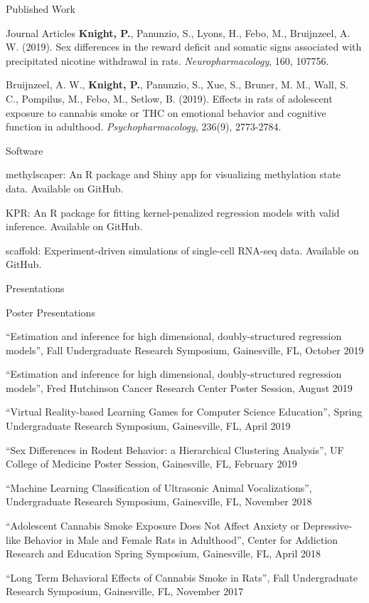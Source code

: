 \documentclass{resume}
\begin{document}
\begin{rSection}{Published Work}
\begin{rSubsection}{Journal Articles}{}{}{}
      \textbf{Knight, P.}, Panunzio, S., Lyons, H., Febo, M., Bruijnzeel, A. W. (2019). Sex differences in
      the reward deficit and somatic signs associated with
      precipitated nicotine withdrawal in rats. \textit{Neuropharmacology},
      160, 107756.
    \item Bruijnzeel, A. W., \textbf{Knight, P.}, Panunzio, S., Xue, S.,
      Bruner, M. M., Wall, S. C., Pompilus, M., Febo, M., Setlow, B. (2019). Effects in
      rats of adolescent exposure to cannabis smoke or THC on
      emotional behavior and cognitive function in
      adulthood. \textit{Psychopharmacology}, 236(9), 2773-2784.
    \end{rSubsection}
    \begin{rSubsection}{Software}{}{}{}
	\item methylscaper: An R package and Shiny app for visualizing methylation state data.     Available on GitHub.
	\item KPR: An R package for fitting kernel-penalized regression models with valid inference. Available on GitHub.
	\item scaffold: Experiment-driven simulations of single-cell RNA-seq data. Available on GitHub.
    \end{rSubsection}
    \end{rSection}

\begin{rSection}{Presentations}
  \begin{rSubsection}{Poster Presentations}{}{}{} %
    \item ``Estimation and inference for high dimensional,
      doubly-structured regression models'', Fall Undergraduate
      Research Symposium, Gainesville, FL, October 2019
    \item  ``Estimation and inference for high dimensional,
      doubly-structured regression models'', Fred Hutchinson Cancer Research Center Poster Session, August 2019
      \item ``Virtual Reality-based Learning Games for Computer Science Education'', Spring Undergraduate Research Symposium, Gainesville, FL, April 2019 
      \item ``Sex Differences in Rodent Behavior: a Hierarchical Clustering Analysis'', UF College of Medicine Poster Session, Gainesville, FL, February 2019
      \item ``Machine Learning Classification of Ultrasonic Animal Vocalizations'', Undergraduate Research Symposium, Gainesville, FL, November 2018
      \item ``Adolescent Cannabis Smoke Exposure Does Not Affect
        Anxiety or Depressive-like Behavior in Male and Female Rats in
        Adulthood'', Center for Addiction Research and Education Spring Symposium, Gainesville, FL, April 2018
      \item``Long Term Behavioral Effects of Cannabis Smoke in Rats'',
        Fall Undergraduate Research Symposium, Gainesville, FL, November 2017
  \end{rSubsection}
  \end{rSection}
\end{document}
